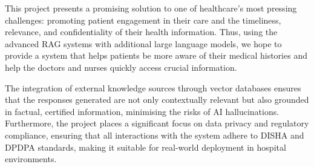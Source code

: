 This project presents a promising solution to one of healthcare's most pressing challenges: promoting patient engagement in their care and the timeliness, relevance, and confidentiality of their health information. Thus, using the advanced RAG systems with additional large language models, we hope to provide a system that helps patients be more aware of their medical histories and help the doctors and nurses quickly access crucial information.

The integration of external knowledge sources through vector databases ensures that the responses generated are not only contextually relevant but also grounded in factual, certified information, minimising the risks of AI hallucinations. Furthermore, the project places a significant focus on data privacy and regulatory compliance, ensuring that all interactions with the system adhere to DISHA\cite{Ganapathy} and DPDPA\@\cite{SundaraNarendran+2023+129+141} standards, making it suitable for real-world deployment in hospital environments.